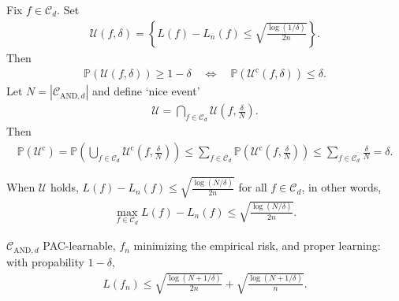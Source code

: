 \documentclass[twoside]{article}
\begin{document}
Fix $f\in \mathcal{C}_d$. Set
\begin{align*}
    \mathcal{U}(f,\delta) = \left\{ L(f) - L_n(f) \le \sqrt{ \frac{\log(1/\delta)}{2n} } \right\}.
\end{align*}
Then
\begin{align*}
    \mathbb{P}\left( \mathcal{U}(f,\delta)  \right) \ge 1- \delta \quad \Longleftrightarrow \quad 
     \mathbb{P}\left( \mathcal{U}^{\text{c}}(f,\delta)  \right) \le \delta.
\end{align*}
Let $N = \left| \mathcal{C}_{\text{AND},d} \right|$ and define `nice event'
\begin{align*}
    \mathcal{U} = \bigcap_{f\in \mathcal{C}_d} \mathcal{U}\left(  f, \frac{\delta}{N} \right).
\end{align*}
Then
\begin{align*}
    \mathbb{P}(\mathcal{U}^{\text{c}})
    = \mathbb{P}\left(  \bigcup_{f\in \mathcal{C}_d} \mathcal{U}^{\text{c}} \left( f, \frac{\delta}{N} \right)  \right)
    \le \sum_{f\in \mathcal{C}_d}  \mathbb{P}\left( \mathcal{U}^{\text{c}} \left( f, \frac{\delta}{N} \right)  \right)
    \le \sum_{f\in \mathcal{C}_d} \frac{ \delta}{N} = \delta. 
\end{align*}

When $\mathcal{U}$ holds, $ L(f) - L_n(f) \le \sqrt{ \frac{\log(N/\delta)}{2n} }$ for all $ f\in \mathcal{C}_d$, in other words,
\begin{align*}
    \max_{ f\in \mathcal{C}_d }  L(f) - L_n(f) \le \sqrt{ \frac{\log(N/\delta)}{2n} }.
\end{align*}

\begin{theorem}
    $\mathcal{C}_{\text{AND},d}$ PAC-learnable, $f_n$ minimizing the empirical risk, and proper learning: with propability $1-\delta$,
    \begin{align*}
        L(f_n) \le \sqrt{ \frac{\log(N+1/\delta)}{2n} } + \sqrt{ \frac{\log(N+1/\delta)}{n} }.
    \end{align*}
\end{theorem}
\end{document}
